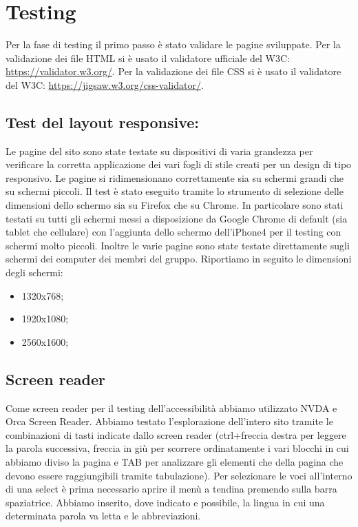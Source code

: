 \newpage
\section{Testing}
Per la fase di testing il primo passo è stato validare le pagine sviluppate.
Per la validazione dei file HTML si è usato il validatore ufficiale del W3C: \url{https://validator.w3.org/}.
Per la validazione dei file CSS si è usato il validatore del W3C: \url{https://jigsaw.w3.org/css-validator/}.

\subsection{Test del layout responsive:} Le pagine del sito sono state testate su dispositivi di varia grandezza per verificare la corretta applicazione dei vari fogli di stile creati per un design di tipo responsivo. Le pagine si ridimensionano correttamente sia su schermi grandi che su schermi piccoli. Il test è stato eseguito tramite lo strumento di selezione delle dimensioni dello schermo sia su Firefox che su Chrome. In particolare sono stati testati su tutti gli schermi messi a disposizione da Google Chrome di default (sia tablet che cellulare) con l'aggiunta dello schermo dell'iPhone4 per il testing con schermi molto piccoli. Inoltre le varie pagine sono state testate direttamente sugli schermi dei computer dei membri del gruppo. Riportiamo in seguito le dimensioni degli schermi:
\begin{itemize}
    \item 1320x768;
    \item 1920x1080;
    \item 2560x1600;
\end{itemize}

\subsection{Screen reader} Come screen reader per il testing dell'accessibilità abbiamo utilizzato NVDA e Orca Screen Reader. Abbiamo testato l'esplorazione dell'intero sito tramite le combinazioni di tasti indicate dallo screen reader (ctrl+freccia destra per leggere la parola successiva, freccia in giù per scorrere ordinatamente i vari blocchi in cui abbiamo diviso la pagina e TAB per analizzare gli elementi che della pagina che devono essere raggiungibili tramite tabulazione). Per selezionare le voci all'interno di una select è prima necessario aprire il menù a tendina premendo sulla barra spaziatrice. Abbiamo inserito, dove indicato e possibile, la lingua in cui una determinata parola va letta e le abbreviazioni.

